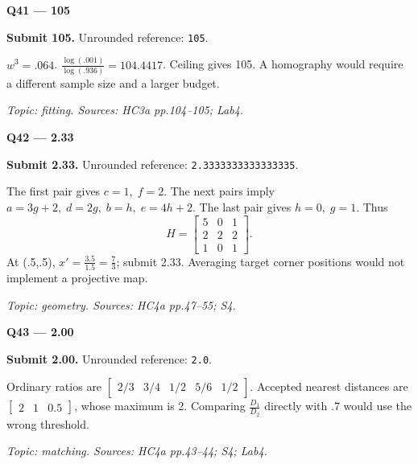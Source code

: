 \documentclass[11pt,a4paper]{article}
\begin{document}
\par\vspace{12pt}
\begin{minipage}{\linewidth}
\textbf{Q41 — 105}\par\smallskip
\textbf{Submit 105.} Unrounded reference: \texttt{105}.\par
\(w^3=.064\). \(\frac{\log(.001)}{\log(.936)}=104.4417\). Ceiling gives 105. A homography would require a different sample size and a larger budget.\par
{\small\itshape Topic: fitting. Sources: HC3a pp.104–105; Lab4.}

\end{minipage}
\par\vspace{12pt}
\begin{minipage}{\linewidth}
\textbf{Q42 — 2.33}\par\smallskip
\textbf{Submit 2.33.} Unrounded reference: \texttt{2.3333333333333335}.\par
The first pair gives \(c=1,\;f=2\). The next pairs imply \(a=3g+2,\;d=2g,\;b=h,\;e=4h+2\). The last pair gives \(h=0,\;g=1\). Thus
\[H=\begin{bmatrix}5&0&1\\2&2&2\\1&0&1\end{bmatrix}.\]
 At (.5,\allowbreak{}.5),\allowbreak{} \(x'=\frac{3.5}{1.5}=\frac{7}{3}\); submit 2.33. Averaging target corner positions would not implement a projective map.\par
{\small\itshape Topic: geometry. Sources: HC4a pp.47–55; S4.}

\end{minipage}
\par\vspace{12pt}
\begin{minipage}{\linewidth}
\textbf{Q43 — 2.00}\par\smallskip
\textbf{Submit 2.00.} Unrounded reference: \texttt{2.0}.\par
Ordinary ratios are \(\begin{bmatrix}2/3&3/4&1/2&5/6&1/2\end{bmatrix}\). Accepted nearest distances are \(\begin{bmatrix}2&1&0.5\end{bmatrix}\),\allowbreak{} whose maximum is 2. Comparing \(\frac{D_1}{D_2}\) directly with .7 would use the wrong threshold.\par
{\small\itshape Topic: matching. Sources: HC4a pp.43–44; S4; Lab4.}

\end{minipage}
\end{document}
